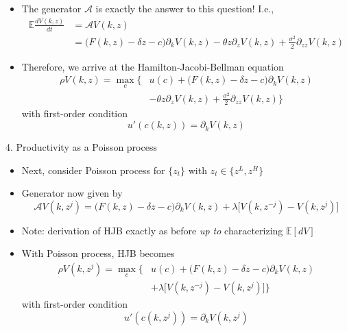 \documentclass[10pt]{beamer}
\begin{document}
\begin{frame}{}
\begin{itemize}
\item The generator $\mathcal A$ is exactly the answer to this question! I.e., 
\begin{align*}
	\mathbb E \frac{d V(k, z)}{d t} &= \mathcal A V(k , z) \\
	&= \Big( F(k, z) - \delta z - c \Big) \partial_k V(k, z) - \theta z \partial_z V(k, z) + \frac{\sigma^2}{2} \partial_{zz} V(k, z)
\end{align*}

\item Therefore, we arrive at the Hamilton-Jacobi-Bellman equation
\begin{align*}
	\rho V(k, z) = \max_c \Big\{ & u(c) + \Big( F(k, z) - \delta z - c \Big) \partial_k V(k, z) \\
	&- \theta z \partial_z V(k, z) + \frac{\sigma^2}{2} \partial_{zz} V(k, z) \Big\}
\end{align*}
with first-order condition 
\begin{equation*}
	u'(c(k, z)) = \partial_k V(k, z)
\end{equation*}
\end{itemize}
\end{frame}



\begin{frame}{4. Productivity as a Poisson process}
\begin{itemize}
\item Next, consider Poisson process for $\{ z_t \}$ with $z_t \in \{z^L, z^H\}$

\item Generator now given by
\begin{equation*}
	\mathcal A V(k, z^j) = \Big( F(k, z) - \delta z - c \Big) \partial_k V(k, z) + \lambda \Big[ V(k, z^{-j}) - V(k, z^j) \Big]
\end{equation*}

\item Note: derivation of HJB exactly as before \textit{up to} characterizing $\mathbb E [d V]$

\item With Poisson process, HJB becomes
\begin{align*}
	\rho V(k, z^j) = \max_c \Big\{ & u(c) + \Big( F(k, z) - \delta z - c \Big) \partial_k V(k, z) \\
	&+ \lambda \Big[ V(k, z^{-j}) - V(k, z^j) \Big] \Big\}
\end{align*}
with first-order condition 
\begin{equation*}
	u'(c(k, z^j)) = \partial_k V(k, z^j)
\end{equation*}
\end{itemize}
\end{frame}
\end{document}
